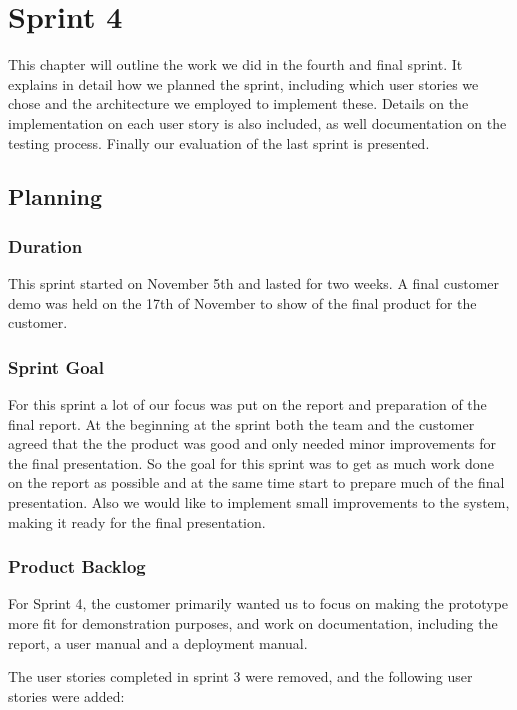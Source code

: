 \chapter{Sprint 4}

\minitoc

This chapter will outline the work we did in the fourth and final sprint. It explains in detail how we planned the sprint, including which user stories we chose and the architecture we employed to implement these. Details on the implementation on each user story is also included, as well documentation on the testing process. Finally our evaluation of the last sprint is presented.

\clearpage


\section{Planning}

\subsection{Duration}
This sprint started on November 5th and lasted for two weeks. A final customer demo was held on the 17th of November to show of the final product for the customer.

\subsection{Sprint Goal}
For this sprint a lot of our focus was put on the report and preparation of the final report. At the beginning at the sprint both the team and the customer agreed that the the product was good and only needed minor improvements for the final presentation. So the goal for this sprint was to get as much work done on the report as possible and at the same time start to prepare much of the final presentation. Also we would like to implement small improvements to the system, making it ready for the final presentation.


\subsection{Product Backlog}
For Sprint 4, the customer primarily wanted us to focus on making the prototype more fit for demonstration purposes, and work on documentation, including the report, a user manual and a deployment manual. 

The user stories completed in sprint 3 were removed, and the following user stories were added:

